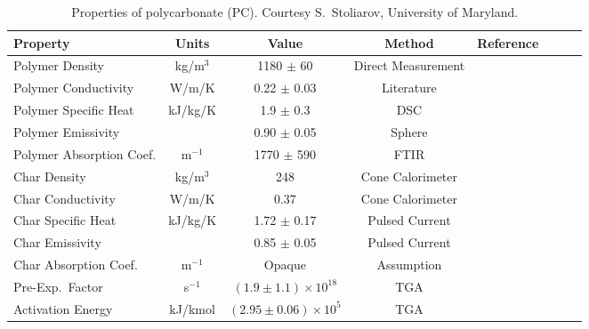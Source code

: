 \begin{table}[h!]
\caption[Properties of polycarbonate (PC).]{Properties of polycarbonate (PC). Courtesy S.~Stoliarov, University of Maryland.}
\begin{center}
\begin{tabular}{|l|c|c|c|c|c|l|l|}
\hline
Property                    & Units         & Value                             & Method                &  Reference                    \\ \hline \hline
Polymer Density             & kg/m$^3$      & 1180 $\pm$ 60                     & Direct Measurement    &  \cite{Stoliarov:CF2010}      \\ \hline
Polymer Conductivity        & W/m/K         & 0.22 $\pm$ 0.03                   & Literature            &  \cite{Stoliarov:CF2010}      \\ \hline
Polymer Specific Heat       & kJ/kg/K       & 1.9 $\pm$ 0.3                     & DSC                   &  \cite{Stoliarov:PDS2008}     \\ \hline
Polymer Emissivity          &               & 0.90 $\pm$ 0.05                   & Sphere                &  \cite{Hallman:PES1974}       \\ \hline
Polymer Absorption Coef.    & m$^{-1}$      & 1770 $\pm$ 590                    & FTIR                  &  \cite{Tsilingiris:ECM2003}   \\ \hline
Char Density                & kg/m$^3$      & 248                               & Cone Calorimeter      &  \cite{Stoliarov:CF2010}      \\ \hline
Char Conductivity           & W/m/K         & 0.37                              & Cone Calorimeter      &  \cite{Stoliarov:CF2010}      \\ \hline
Char Specific Heat          & kJ/kg/K       & 1.72 $\pm$ 0.17                   & Pulsed Current        &  \cite{Stoliarov:CF2010,Matsumoto:1996}  \\ \hline
Char Emissivity             &               & 0.85 $\pm$ 0.05                   & Pulsed Current        &  \cite{Stoliarov:CF2010,Matsumoto:1996}  \\ \hline
Char Absorption Coef.       & m$^{-1}$      & Opaque                            & Assumption            &  \cite{Stoliarov:CF2010}      \\ \hline
Pre-Exp.~Factor             & s$^{-1}$      & $(1.9 \pm 1.1) \times 10^{18}$    & TGA                   &  \cite{Stoliarov:CF2010}      \\ \hline
Activation Energy           & kJ/kmol       & $(2.95 \pm 0.06) \times 10^{5}$   & TGA                   &  \cite{Stoliarov:CF2010}      \\ \hline

\end{tabular}
\end{center}
\end{table}
